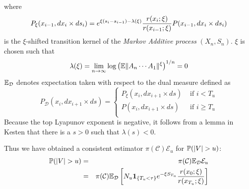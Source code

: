 \documentclass{article}
\begin{document}
where
\[
P_\xi(x_{i-1}, dx_i \times ds_i) = e^{\xi(s_i - s_{i-1}) -
  \lambda(\xi)} {r(x_i; \xi) \over r(x_{i-1}; \xi)} P(x_{i-1}, dx_i
\times ds_i)
\]
is the $\xi$-shifted transition kernel of the {\it Markov Additive
  process} $(X_n, S_n)$. $\xi$ is chosen such that 
\[
\lambda(\xi) = \lim_{n \to \infty} \log \left(
\E \|A_n \cdots A_1\|^\xi
\right)^{1/n} = 0
\]
$\E_{\mathcal D}$ denotes expectation taken with respect to the dual
measure defined as
\[
P_{\mathcal D} (x_i, dx_{i+1} \times ds) = \left\{
  \begin{array}{ll}
    P_\xi (x_i, dx_{i+1} \times ds) & \text{ if } i < T_u \\
    P(x_i, dx_{i+1} \times ds) & \text{ if } i \geq T_u \\
  \end{array}
\right.
\]
Because the top Lyapunov exponent is negative, it follows from a lemma
in Kesten \cite{Kesten1973} that there is a $s > 0$ such that
$\lambda(s) < 0$.

Thus we have obtained a consistent estimator
$\pi(\mathcal C)\mathcal E_u$ for $\P(|V| > u)$:
\begin{eqnarray*}
\P(|V| > u) &=& \pi(\mathcal C) \E_{\mathcal D} \mathcal E_u \\
&=& \pi(\mathcal C) \E_{\mathcal D} \left[
  N_u \1{T_u < \tau} e^{-\xi S_{T_u}} {r(x_0; \xi)
    \over r(x_{T_u}; \xi)}
\right]
\end{eqnarray*}
\end{document}
